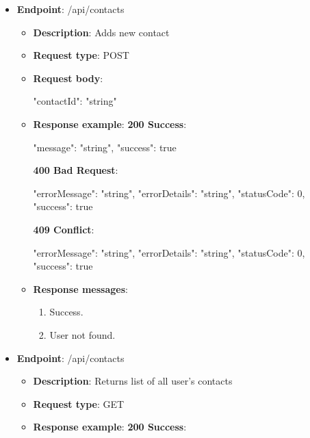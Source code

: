 \begin{itemize}
    \item \textbf{Endpoint}: /api/contacts
    \begin{itemize}
        \item \textbf{Description}: Adds new contact
        \item \textbf{Request type}: POST
        \item \textbf{Request body}:
        \begin{spverbatim}
        {
            "contactId": "string"
        }
        \end{spverbatim}
        \item \textbf{Response example}:
        \textbf{200 Success}:
        \begin{spverbatim}
        {
            "message": "string",
            "success": true
        }
        \end{spverbatim}
        \textbf{400 Bad Request}:
        \begin{spverbatim}
        {
            "errorMessage": "string",
            "errorDetails": "string",
            "statusCode": 0,
            "success": true
        }
        \end{spverbatim}
        \textbf{409 Conflict}:
        \begin{spverbatim}
        {
            "errorMessage": "string",
            "errorDetails": "string",
            "statusCode": 0,
            "success": true
        }
        \end{spverbatim}
        \item \textbf{Response messages}:
        \begin{enumerate}
            \item Success.
            \item User not found.
        \end{enumerate}
    \end{itemize}
    \item \textbf{Endpoint}: /api/contacts
    \begin{itemize}
        \item \textbf{Description}: Returns list of all user's contacts
        \item \textbf{Request type}: GET
        \item \textbf{Response example}:
        \textbf{200 Success}:
        \begin{spverbatim}

\end{spverbatim}
\end{itemize}
\end{itemize}
